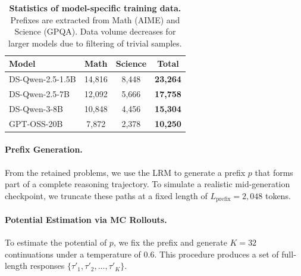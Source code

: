 \documentclass[11pt]{article}
\theoremstyle{plain}
\begin{document}
\begin{table}[t]
\centering
\small
\setlength{\tabcolsep}{4pt}
\caption{\textbf{Statistics of model-specific training data.} Prefixes are extracted from Math (AIME) and Science (GPQA). Data volume decreases for larger models due to filtering of trivial samples.}
\label{tab:training_data_stats}
\begin{tabular}{l c c c}
\toprule
\textbf{Model} & \textbf{Math} & \textbf{Science} & \textbf{Total} \\
\midrule
DS-Qwen-2.5-1.5B & 14,816 & 8,448 & \textbf{23,264} \\
DS-Qwen-2.5-7B   & 12,092 & 5,666 & \textbf{17,758} \\
DS-Qwen-3-8B     & 10,848 & 4,456 & \textbf{15,304} \\
GPT-OSS-20B      & 7,872  & 2,378 & \textbf{10,250} \\
\bottomrule
\end{tabular}
\vspace{-3mm}
\end{table}

\paragraph{Prefix Generation.} 
From the retained problems, we use the LRM to generate a prefix $p$ that forms part of a complete reasoning trajectory. To simulate a realistic mid-generation checkpoint, we truncate these paths at a fixed length of \textbf{$L_{\text{prefix}} = 2{,}048$} tokens.

\paragraph{Potential Estimation via MC Rollouts.}
To estimate the potential of $p$, we fix the prefix and generate \textbf{$K=32$} continuations under a temperature of $0.6$. This procedure produces a set of full-length responses $\{\tau'_{1}, \tau'_{2}, \ldots, \tau'_{K}\}$.
\end{document}
